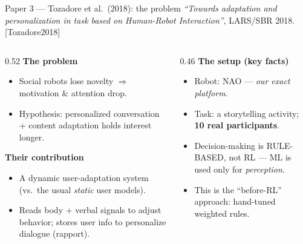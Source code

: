 \documentclass[aspectratio=169,10pt]{beamer}
\newcommand{\refnum}[1]{{\footnotesize\color{giuaccent}[#1]}}
\begin{document}
\begin{frame}{Paper 3 --- Tozadore et al.\ (2018): the problem}
  \footnotesize \emph{``Towards adaptation and personalization in task based on Human-Robot Interaction''}, LARS/SBR 2018. \refnum{Tozadore2018}
  \vspace{0.4em}
  \begin{columns}[T]
    \begin{column}{0.52\textwidth}
      \textbf{The problem}
      \begin{itemize}\footnotesize
        \item Social robots lose \alert{novelty} $\Rightarrow$ motivation \& attention drop.
        \item Hypothesis: personalized conversation + content adaptation holds interest longer.
      \end{itemize}
      \textbf{Their contribution}
      \begin{itemize}\footnotesize
        \item A \alert{dynamic} user-adaptation system (vs.\ the usual \emph{static} user models).
        \item Reads body + verbal signals to adjust behavior; stores user info to personalize dialogue (rapport).
      \end{itemize}
    \end{column}
    \begin{column}{0.46\textwidth}
      \textbf{The setup (key facts)}
      \begin{itemize}\footnotesize
        \item Robot: \alert{NAO} --- \emph{our exact platform}.
        \item Task: a storytelling activity; \textbf{10 real participants}.
        \item \alert{Decision-making is RULE-BASED}, not RL --- ML is used only for \emph{perception}.
        \item This is the ``before-RL'' approach: hand-tuned weighted rules.
      \end{itemize}
    \end{column}
  \end{columns}
\end{frame}
\end{document}
